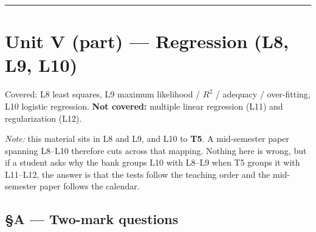 \documentclass[11pt,a4paper]{article}
\begin{document}
\vspace{0.4em}\hrule

\section*{Unit V (part) --- Regression \quad (L8, L9, L10)}

\begin{warnbox}
Covered: L8 least squares, L9 maximum likelihood / $R^2$ / adequacy /
over-fitting, L10 logistic regression. \textbf{Not covered:} multiple linear
regression (L11) and regularization (L12).

\emph{Note:} this material sits in L8 and L9, and
L10 to \textbf{T5}. A mid-semester paper spanning L8--L10 therefore cuts across
that mapping. Nothing here is wrong, but if a student asks why the bank groups
L10 with L8--L9 when T5 groups it with L11--L12, the answer is that the tests
follow the teaching order and the mid-semester paper follows the calendar.
\end{warnbox}

\subsection*{§A --- Two-mark questions}
\end{document}
